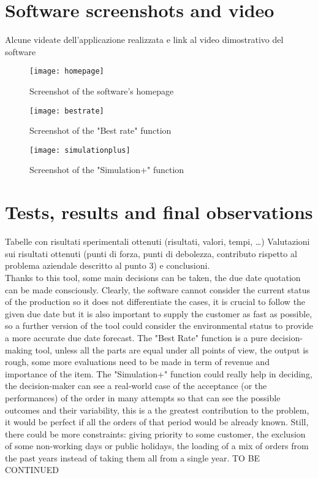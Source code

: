 \documentclass[a4paper,12pt]{article}
\begin{document}
\newpage
\section{Software screenshots and video}
Alcune videate dell’applicazione realizzata e link al video dimostrativo del software
\begin{figure}[H]
	\centering
   	 \texttt{[image: homepage]}
	\caption{Screenshot of the software's homepage}
\end{figure}

\begin{figure}[H]
	\centering
   	 \texttt{[image: bestrate]}
	\caption{Screenshot of the "Best rate" function}
\end{figure}

\begin{figure}[H]
	\centering
   	 \texttt{[image: simulationplus]}
	\caption{Screenshot of the "Simulation+" function}
\end{figure}

\newpage
\section{Tests, results and final observations}
Tabelle con risultati sperimentali ottenuti (risultati, valori, tempi, …)
Valutazioni sui risultati ottenuti (punti di forza, punti di debolezza, contributo rispetto al problema aziendale descritto al punto 3) e conclusioni.\\
Thanks to this tool, some main decisions can be taken, the due date quotation can be made consciously. Clearly, the software cannot consider the current status of the production so it does not differentiate the cases, it is crucial to follow the given due date but it is also important to supply the customer as fast as possible, so a further version of the tool could consider the environmental status to provide a more accurate due date forecast. The "Best Rate" function is a pure decision-making tool, unless all the parts are equal under all points of view, the output is rough, some more evaluations need to be made in term of revenue and importance of the item. The "Simulation+" function could really help in deciding, the decision-maker can see a real-world case of the acceptance (or the performances) of the order in many attempts so that can see the possible outcomes and their variability, this is a the greatest contribution to the problem, it would be perfect if all the orders of that period would be already known. Still, there could be more constraints: giving priority to some customer, the exclusion of some non-working days or public holidays, the loading of a mix of orders from the past years instead of taking them all from a single year.  TO BE CONTINUED
\end{document}

